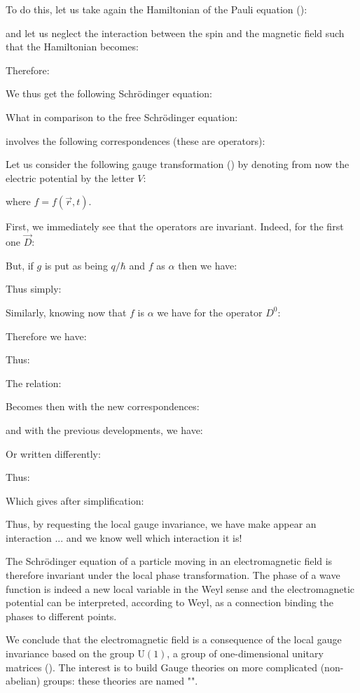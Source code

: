 	To do this, let us take again the Hamiltonian of the Pauli equation ():
	
	and let us neglect the interaction between the spin and the magnetic field such that the Hamiltonian becomes:
	
	Therefore:
	
	We thus get the following Schrödinger equation:
	
	What in comparison to the free Schrödinger equation:
	
	involves the following correspondences (these are operators):
	
	Let us consider the following gauge transformation () by denoting from now the electric potential by the letter $V$:
	
	where $f=f(\vec{r},t)$.
	
	First, we immediately see that the operators are invariant. Indeed, for the first one $\vec{D}$:
	
	But, if $g$ is put as being $q/\hbar$ and $f$ as $\alpha$ then we have:
	
	Thus simply:
	
	Similarly, knowing now that $f$ is $\alpha$ we have for the operator $D^0$:
	
	Therefore we have:
	
	Thus:
	
	The relation:
	
	Becomes then with the new correspondences:
	
	and with the previous developments, we have:
	
	Or written differently:
	
	Thus:
	
	Which gives after simplification:
	
	Thus, by requesting the local gauge invariance, we have make appear an interaction ... and we know well which interaction it is!

	The Schrödinger equation of a particle moving in an electromagnetic field is therefore invariant under the local phase transformation. The phase of a wave function is indeed a new local variable in the Weyl sense and the electromagnetic potential can be interpreted, according to Weyl, as a connection binding the phases to different points.

	We conclude that the electromagnetic field is a consequence of the local gauge invariance based on the group $\text{U}(1)$, a group of one-dimensional unitary matrices (). The interest is to build Gauge theories on more complicated (non-abelian) groups: these theories are named "".
	
